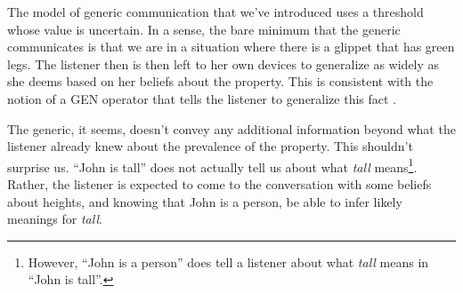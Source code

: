 \documentclass[10pt,letterpaper]{article}
\begin{document}
The model of generic communication that we've introduced uses a threshold whose value is uncertain. 
In a sense, the bare minimum that the generic communicates is that we are in a situation where there is a glippet that has green legs. 
The listener then is then left to her own devices to generalize as widely as she deems based on her beliefs about the property. 
This is consistent with the notion of a GEN operator that tells the listener to generalize this fact \cite{Leslie2008}.


The generic, it seems, doesn't convey any additional information beyond what the listener already knew about the prevalence of the property.
This shouldn't surprise us. ``John is tall'' does not actually tell us about what \emph{tall} means\footnote{However, ``John is a person'' does tell a listener about what \emph{tall} means in ``John is tall''.}. 
Rather, the listener is expected to come to the conversation with some beliefs about heights, and knowing that John is a person, be able to infer likely meanings for \emph{tall}.






%
%



\end{document}
